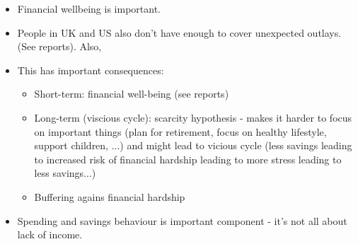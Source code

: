 \begin{itemize}
    \item Financial wellbeing is important.

    \item People in UK and US also don't have enough to cover unexpected
        outlays. (See reports). Also, \citet{sabat2019rules}

    \item This has important consequences:

        \begin{itemize}

            \item Short-term: financial well-being (see reports)

            \item Long-term (viscious cycle): scarcity hypothesis - makes it
                harder to focus on important things (plan for retirement, focus
                on healthy lifestyle, support children, ...) and might lead to
                vicious cycle (less savings leading to increased risk of
                financial hardship leading to more stress leading to less
                savings...)

            \item Buffering agains financial hardship \citep{roll2020income}
        \end{itemize}

    \item Spending and savings behaviour is important component - it's not all
        about lack of income.

\end{itemize}





